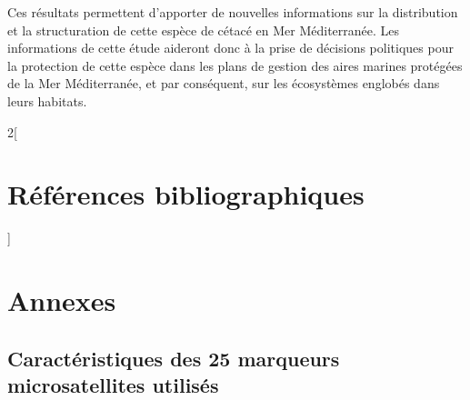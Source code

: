 \documentclass[a4paper,12pt,twoside]{article}\usepackage[]{graphicx}\usepackage[]{color}
\begin{document}
Ces résultats permettent d'apporter de nouvelles informations sur la distribution et la structuration de cette espèce de cétacé en Mer Méditerranée. Les informations de cette étude aideront donc à la prise de décisions politiques pour la protection de cette espèce dans les plans de gestion des aires marines protégées de la Mer Méditerranée, et par conséquent, sur les écosystèmes englobés dans leurs habitats.


\FloatBarrier
\newpage
\begin{otherlanguage}{english}
	\singlespacing
	\begin{multicols}{2}[\section*{Références bibliographiques}]
		\begingroup
		\def\section*#1{}
		\small
		
		
		\endgroup
	\end{multicols}
\end{otherlanguage}

\section{Annexes}
\subsection{Caractéristiques des 25 marqueurs microsatellites utilisés}\label{microsats}
\end{document}
